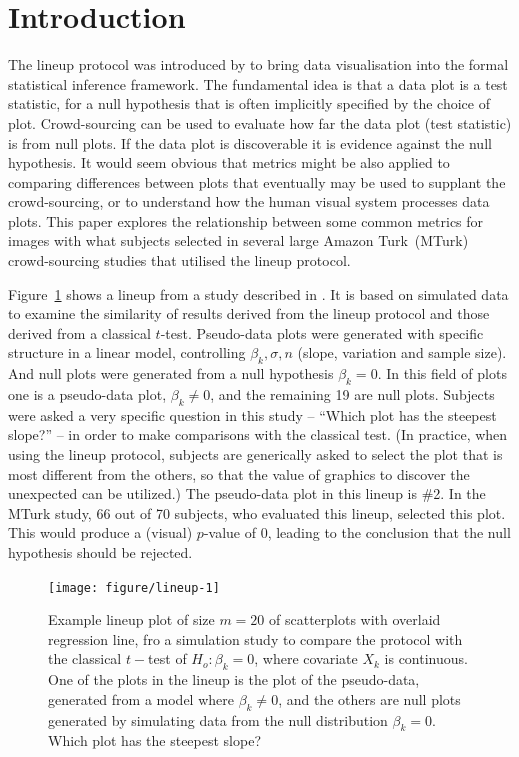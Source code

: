\documentclass[12pt]{article}\usepackage[]{graphicx}\usepackage[]{color}
\newenvironment{knitrout}{}{} %
\begin{document}
\section{Introduction} 
The lineup protocol was introduced by \citet{buja:2009} to bring data visualisation into the formal statistical inference framework. The fundamental idea is that a data plot is a test statistic, for a null hypothesis that is often implicitly specified by the choice of plot. Crowd-sourcing can be used to evaluate how far the data plot (test statistic) is from null plots. If the data plot is discoverable it is evidence against the null hypothesis. It would seem obvious that metrics might be also applied to comparing differences between plots that eventually may be used to supplant the crowd-sourcing, or to understand how the human visual system processes data plots. This paper explores the relationship between some common metrics for images with what subjects selected in several large Amazon Turk~(MTurk)~\citep{turk} crowd-sourcing studies that utilised the lineup protocol.


Figure~\ref{lineup-example} shows a lineup from a study described in \citet{majumder:2011}. It is based on simulated data to examine the similarity of results derived from the lineup protocol and those derived from a classical $t$-test. Pseudo-data plots were generated with specific structure in a linear model, controlling $\beta_k, \sigma, n$ (slope, variation and sample size). And null plots were generated from a null hypothesis $\beta_k=0$. In this field of plots one is a pseudo-data plot, $\beta_k\neq 0$, and the remaining 19 are null plots. Subjects were asked a very specific question in this study -- ``Which plot has the steepest slope?'' -- in order to make comparisons with the classical test. (In practice, when using the lineup protocol, subjects are generically asked to select the plot that is most different from the others, so that the value of graphics to discover the unexpected can be utilized.) The pseudo-data plot in this lineup is \#2. In the MTurk study, 66 out of 70 subjects, who evaluated this lineup, selected this plot. This would produce a (visual) $p$-value of 0, leading to the conclusion that the null hypothesis should be rejected. 
\begin{figure}[!t]
\centering
\begin{knitrout}
\color{fgcolor}
\texttt{[image: figure/lineup-1]} 

\end{knitrout}
\caption{Example lineup plot of size $m = 20$ of scatterplots with overlaid regression line, fro a simulation study to compare the protocol with the classical $t-$test of $H_o: \beta_k = 0$, where covariate $X_k$ is continuous. One of the plots in the lineup is the plot of the pseudo-data, generated from a model where $\beta_k\neq 0$, and the others are null plots generated by simulating data from the null distribution $\beta_k = 0$. Which plot has the steepest slope? }
\label{lineup-example}
\end{figure}
\end{document}
